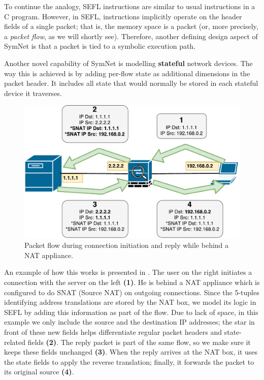 To continue the analogy, SEFL instructions are similar to usual instructions in
a C program.  However, in SEFL, instructions implicitly operate on the header
fields of a single packet; that is, the memory space is a packet (or, more
precisely, a \emph{packet flow}, as we will shortly see).  Therefore, another
defining design aspect of SymNet is that a packet is tied to a symbolic
execution path.

Another novel capability of SymNet is modelling \textbf{stateful} network
devices.  The way this is achieved is by adding per-flow state as additional
dimensions in the packet header.  It includes all state that would normally be
stored in each stateful device it traverses.

\begin{figure}[h]
  \centering
  \captionsetup{justification=centering}
  \includegraphics[scale=0.6]{src/img/snat-example}
  \caption{Packet flow during connection initiation and reply while behind a
  NAT appliance.}
  \label{fig:snat-example}
\end{figure}

An example of how this works is presented in
.  The user on the right initiates a
connection with the server on the left \textbf{(1)}.  He is behind a NAT
appliance which is configured to do SNAT (Source NAT) on outgoing connections.
Since the 5-tuples identifying address translations are stored by the NAT box,
we model its logic in SEFL by adding this information as part of the flow. Due
to lack of space, in this example we only include the source and the
destination IP addresses; the star in front of these new fields helps
differentiate regular packet headers and state-related fields \textbf{(2)}.
The reply packet is part of the same flow, so we make sure it keeps these
fields unchanged \textbf{(3)}.  When the reply arrives at the NAT box, it uses
the state fields to apply the reverse translation; finally, it forwards the
packet to its original source \textbf{(4)}.

